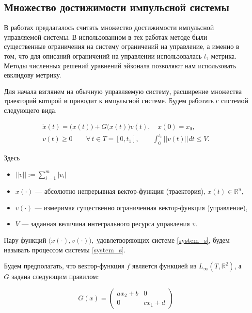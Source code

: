 \subsection{Множество достижимости импульсной системы}
\label{sec:ids}

В работах \cite{AVS2016, AV2015_1,AV2015_2} предлагалось считать
множество достижимости импульсной управляемой системы. В
использованном в тех работах методе были существенные ограничения на
систему ограничений на управление, а именно в том, что для описаний
ограничений на управлении использовалась $l_1$ метрика. Методы
численных решений уравнений эйконала позволяют нам использовать
евклидову метрику. 

Для начала взглянем на обычную
управляемую систему, расширение множества траекторий которой и
приводит к импульсной системе. Будем работать с системой следующего
вида.

\begin{equation}
  \label{system_s}
  \begin{array}{l}
    \dot{x}(t)=\big(x(t)\big)+G\big(x(t)\big)v(t), \quad x(0)=x_0, \\[8pt]
    v(t)\geq 0  \qquad \forall\, t\in T = [0,t_1], \qquad
    \displaystyle\int_{0}^{t_1} ||v(t)||dt\leq V.
  \end{array} 
\end{equation}

Здесь
\begin{itemize}
  \item $||v||:=\displaystyle\sum_{i=1}^m |v_i|$
  \item $x(\cdot)$ --- абсолютно непрерывная вектор-функция
    (траектория), $x(t)\in {\mathbb R}^n,$
  \item $v(\cdot)$ --- измеримая существенно ограниченная
    вектор-функция (управление),
  
  \item $V$ --- заданная величина интегрального ресурса управления
    $v$.
\end{itemize}

Пару функций $\bigl(x(\cdot),v(\cdot)\bigr),$ удовлетворяющих
системе \eqref{system_s}, будем называть процессом системы \eqref{system_s}.

Будем предполагать, что вектор-функция $f$ является функцией из
$L_{\infty}(T,\mathbb{R}^2)$, а $G$ задана следующим правилом:

\begin{equation*}
  G(x) = 
  \begin{pmatrix}
    a x_2+b & 0\\ 0 & c x_1 +d 
  \end{pmatrix}
\end{equation*}
     
